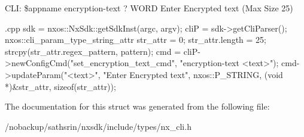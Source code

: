 CLI: \$appname encryption-\/text ? WORD Enter Encrypted text (Max Size 25)


\begin{DoxyCode}
 {.cpp}
       sdk = nxos::NxSdk::getSdkInst(argc, argv);
       cliP = sdk->getCliParser();
       nxos::cli_param_type_string_attr str_attr = {0};
       str_attr.length = 25;
       strcpy(str_attr.regex_pattern, pattern);
       cmd = cliP->newConfigCmd("set_encryption_text_cmd",
                                "encryption-text <text>");
       cmd->updateParam("<text>", "Enter Encrypted text", nxos::P_STRING,
                        (void *)&str_attr, sizeof(str_attr));
\end{DoxyCode}



 

The documentation for this struct was generated from the following file:\begin{DoxyCompactItemize}
\item 
/nobackup/sathsrin/nxsdk/include/types/nx\_\-cli.h\end{DoxyCompactItemize}

